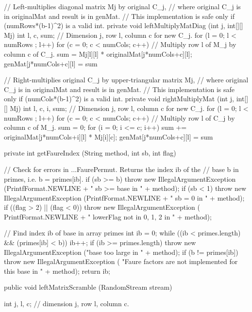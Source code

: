 \begin{code}
\begin{hide}
   // Left-multiplies diagonal matrix Mj by original C_j,
   // where original C_j is in originalMat and result is in genMat.
   // This implementation is safe only if (numRows*(b-1)^2) is a valid int.
   private void leftMultiplyMatDiag (int j, int[][] Mj) {
      int l, c, sum;   // Dimension j, row l, column c for new C_j.
      for (l = 0; l < numRows ; l++) {
         for (c = 0; c < numCols; c++) {
            // Multiply row l of M_j by column c of C_j.
            sum = Mj[l][l] * originalMat[j*numCols+c][l];
            genMat[j*numCols+c][l] = sum %
         }
      }
   }


   // Right-multiplies original C_j by upper-triangular matrix Mj,
   // where original C_j is in originalMat and result is in genMat.
   // This implementation is safe only if (numCols*(b-1)^2) is a valid int.
   private void rightMultiplyMat (int j, int[][] Mj) {
      int l, c, i, sum;   // Dimension j, row l, column c for new C_j.
      for (l = 0; l < numRows ; l++) {
         for (c = 0; c < numCols; c++) {
            // Multiply row l of C_j by column c of M_j.
            sum = 0;
            for (i = 0; i <= c; i++)
               sum += originalMat[j*numCols+i][l] * Mj[i][c];
            genMat[j*numCols+c][l] = sum %
         }
      }
   }


   private int getFaureIndex (String method, int sb, int flag) {
      // Check for errors in ...FaurePermut. Returns the index ib of the
      // base b in primes, i.e.  b = primes[ib].
      if (sb >= b)
         throw new IllegalArgumentException (PrintfFormat.NEWLINE +
            "   sb >= base in " + method);
      if (sb < 1)
         throw new IllegalArgumentException (PrintfFormat.NEWLINE +
            "   sb = 0 in " + method);
      if ((flag > 2) || (flag < 0))
         throw new IllegalArgumentException (
             PrintfFormat.NEWLINE + "   lowerFlag not in {0, 1, 2} in "
             + method);

      // Find index ib of base in array primes
      int ib = 0;
      while ((ib < primes.length) && (primes[ib] < b))
          ib++;
      if (ib >= primes.length)
         throw new IllegalArgumentException ("base too large in " + method);
      if (b != primes[ib])
         throw new IllegalArgumentException (
            "Faure factors are not implemented for this base in " + method);
      return ib;
      }
\end{hide}

   public void leftMatrixScramble (RandomStream stream) \begin{hide} {
      int j, l, c;  // dimension j, row l, column c.

}
\end{hide}
\end{code}
